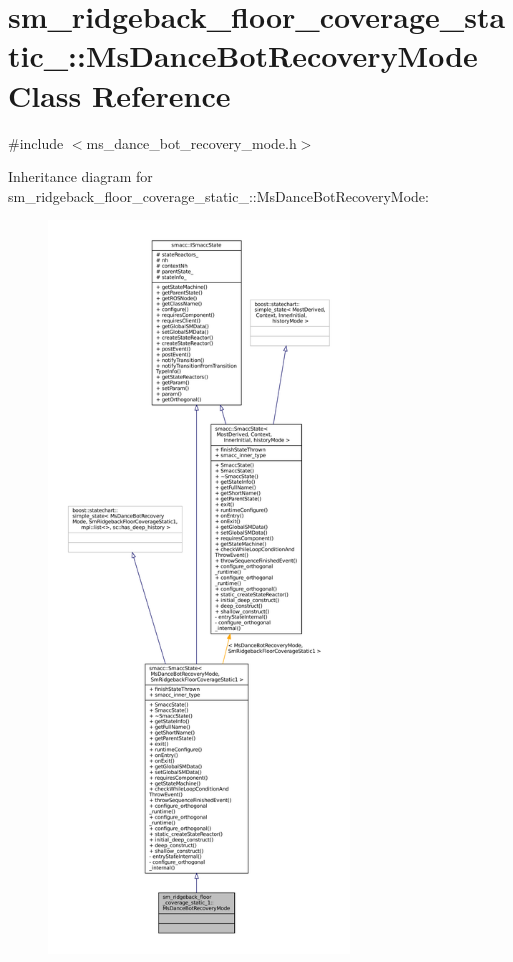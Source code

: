 \hypertarget{classsm__ridgeback__floor__coverage__static__1_1_1MsDanceBotRecoveryMode}{}\section{sm\+\_\+ridgeback\+\_\+floor\+\_\+coverage\+\_\+static\+\_\+:\+:Ms\+Dance\+Bot\+Recovery\+Mode Class Reference}
\label{classsm__ridgeback__floor__coverage__static__1_1_1MsDanceBotRecoveryMode}


{\ttfamily \#include $<$ms\+\_\+dance\+\_\+bot\+\_\+recovery\+\_\+mode.\+h$>$}



Inheritance diagram for sm\+\_\+ridgeback\+\_\+floor\+\_\+coverage\+\_\+static\+\_\+:\+:Ms\+Dance\+Bot\+Recovery\+Mode\+:
\nopagebreak
\begin{figure}[H]
\begin{center}
\leavevmode
\includegraphics[height=550pt]{classsm__ridgeback__floor__coverage__static__1_1_1MsDanceBotRecoveryMode__inherit__graph}
\end{center}
\end{figure}



